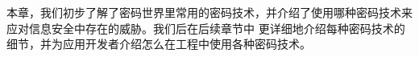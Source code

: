 
\startsection[title={本章小结}]

本章，我们初步了解了密码世界里常用的密码技术，并介绍了使用哪种密码技术来应对信息安全中存在的威胁。我们后在后续章节中
更详细地介绍每种密码技术的细节，并为应用开发者介绍怎么在工程中使用各种密码技术。

\stopsection
